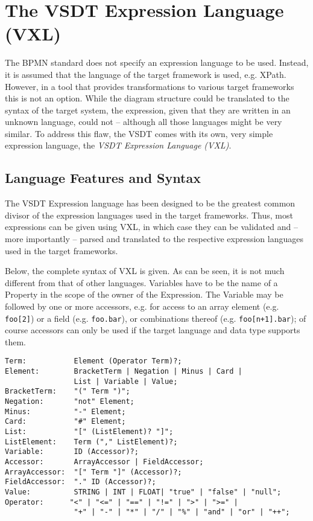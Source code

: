 \chapter{The VSDT Expression Language (VXL)}
\label{sec:vxl}

The BPMN standard does not specify an expression language to be used.  Instead,
it is assumed that the language of the target framework is used, e.g.  XPath.
However, in a tool that provides transformations to various target frameworks
this is not an option.  While the diagram structure could be translated to the
syntax of the target system, the expression, given that they are written in an
unknown language, could not -- although all those languages might be very similar.
To address this flaw, the VSDT comes with its own, very simple expression language,
the \emph{VSDT Expression Language (VXL)}.



\section{Language Features and Syntax}

The VSDT Expression language has been designed to be the greatest common divisor
of the expression languages used in the target frameworks.  Thus, most expressions
can be given using VXL, in which case they can be validated and -- more importantly
-- parsed and translated to the respective expression languages used in the target
frameworks.

Below, the complete syntax of VXL is given.  As can be seen, it is not much
different from that of other languages.  Variables have to be the name of a
Property in the scope of the owner of the Expression.  The Variable may be followed
by one or more accessors, e.g. for access to an array element (e.g. \verb|foo[2]|)
or a field (e.g. \verb|foo.bar|), or combinations thereof (e.g. \verb|foo[n+1].bar|);
of course accessors can only be used if the target language and data type supports
them.

\begin{verbatim}
Term:           Element (Operator Term)?;
Element:        BracketTerm | Negation | Minus | Card |
                List | Variable | Value;
BracketTerm:    "(" Term ")";
Negation:       "not" Element;
Minus:          "-" Element;
Card:           "#" Element;
List:           "[" (ListElement)? "]";
ListElement:    Term ("," ListElement)?;
Variable:       ID (Accessor)?;
Accessor:       ArrayAccessor | FieldAccessor;
ArrayAccessor:  "[" Term "]" (Accessor)?;
FieldAccessor:  "." ID (Accessor)?;
Value:          STRING | INT | FLOAT| "true" | "false" | "null";
Operator:      "<" | "<=" | "==" | "!=" | ">" | ">=" | 
                "+" | "-" | "*" | "/" | "%" | "and" | "or" | "++";
\end{verbatim}


